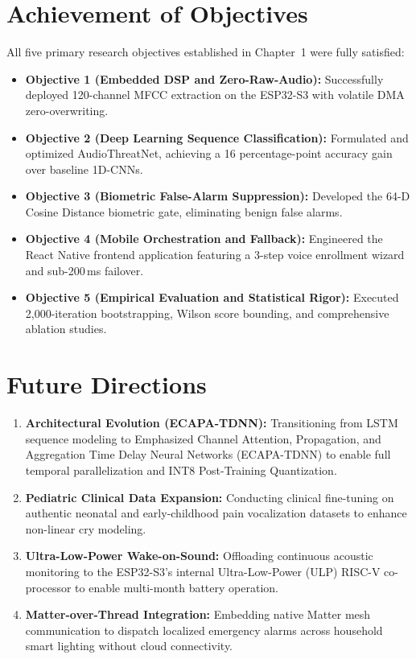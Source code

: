 \documentclass[12pt, a4paper]{report}
\begin{document}
\section{Achievement of Objectives}
All five primary research objectives established in Chapter~1 were fully satisfied:
\begin{itemize}
    \item \textbf{Objective 1 (Embedded DSP and Zero-Raw-Audio):} Successfully deployed 120-channel MFCC extraction on the ESP32-S3 with volatile DMA zero-overwriting.
    \item \textbf{Objective 2 (Deep Learning Sequence Classification):} Formulated and optimized AudioThreatNet, achieving a 16 percentage-point accuracy gain over baseline 1D-CNNs.
    \item \textbf{Objective 3 (Biometric False-Alarm Suppression):} Developed the 64-D Cosine Distance biometric gate, eliminating benign false alarms.
    \item \textbf{Objective 4 (Mobile Orchestration and Fallback):} Engineered the React Native frontend application featuring a 3-step voice enrollment wizard and sub-200\,ms failover.
    \item \textbf{Objective 5 (Empirical Evaluation and Statistical Rigor):} Executed 2,000-iteration bootstrapping, Wilson score bounding, and comprehensive ablation studies.
\end{itemize}

\section{Future Directions}
\begin{enumerate}
    \item \textbf{Architectural Evolution (ECAPA-TDNN):} Transitioning from LSTM sequence modeling to Emphasized Channel Attention, Propagation, and Aggregation Time Delay Neural Networks (ECAPA-TDNN) to enable full temporal parallelization and INT8 Post-Training Quantization.
    \item \textbf{Pediatric Clinical Data Expansion:} Conducting clinical fine-tuning on authentic neonatal and early-childhood pain vocalization datasets to enhance non-linear cry modeling.
    \item \textbf{Ultra-Low-Power Wake-on-Sound:} Offloading continuous acoustic monitoring to the ESP32-S3's internal Ultra-Low-Power (ULP) RISC-V co-processor to enable multi-month battery operation.
    \item \textbf{Matter-over-Thread Integration:} Embedding native Matter mesh communication to dispatch localized emergency alarms across household smart lighting without cloud connectivity.
\end{enumerate}
\end{document}

